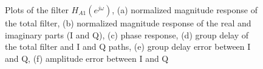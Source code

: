 \documentclass[a4paper,BCOR7mm,12pt,pointlessnumbers,bibtotoc]{scrartcl}
\begin{document}
\begin{figure}[H]
  \caption{Plots of the filter $H_{A1}(e^{j \omega})$, (a) normalized magnitude response of the total filter, (b) normalized magnitude response of the real and imaginary parts (I and Q), (c) phase response, (d) group delay of the total filter and I and Q paths, (e) group delay error between I and Q, (f) amplitude error between I and Q}
  \label{fig:h_a1}
\end{figure}
\end{document}
